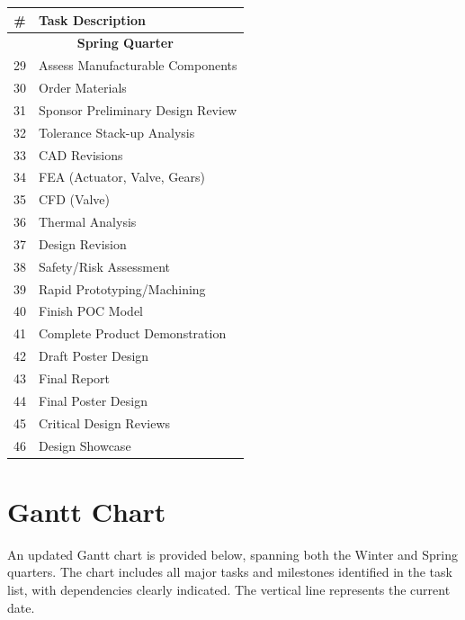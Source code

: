 \documentclass[12pt, letterpaper]{report}%
\newcounter{mycounter}           %
\newcounter{sub}[mycounter]      %
\begin{document}
\begin{table}[h]
\centering
\begin{tabular}{@{} c l @{}}
\toprule
\textbf{\#} & \textbf{Task Description} \\
\midrule
\multicolumn{2}{c}{\textbf{Spring Quarter}} \\
\midrule
29 & Assess Manufacturable Components \\
30 & Order Materials \\
31 & Sponsor Preliminary Design Review \\
32 & Tolerance Stack-up Analysis \\
33 & CAD Revisions \\
34 & FEA (Actuator, Valve, Gears) \\
35 & CFD (Valve) \\
36 & Thermal Analysis \\
37 & Design Revision \\
38 & Safety/Risk Assessment \\
39 & Rapid Prototyping/Machining \\
40 & Finish POC Model \\
41 & Complete Product Demonstration \\
42 & Draft Poster Design \\
43 & Final Report \\
44 & Final Poster Design \\
45 & Critical Design Reviews \\
46 & Design Showcase \\
\bottomrule
\end{tabular}
\end{table}



\section{Gantt Chart}
\label{subsec:gantt}

    An updated Gantt chart is provided below, spanning both the Winter and Spring quarters. 
    The chart includes all major tasks and milestones identified in the task list, with dependencies clearly indicated. 
    The vertical line represents the current date.





\end{document}

